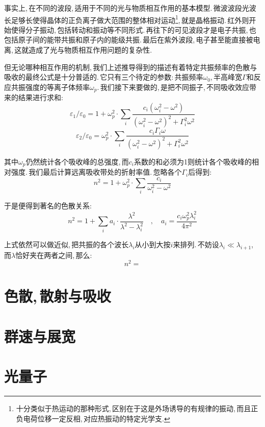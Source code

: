 事实上,\,在不同的波段,\,适用于不同的光与物质相互作用的基本模型.\,微波波段光波长足够长使得晶体的正负离子做大范围的整体相对运动\footnote{十分类似于热运动的那种形式,\,区别在于这是外场诱导的有规律的振动,\,而且正负电荷位移一定反相,\,对应热振动的特定光学支.},\,就是晶格振动.\,红外则开始使得分子振动,\,包括转动和振动等不同形式.\,再往下的可见波段才是电子共振,\,也包括原子间的能带共振和原子内的能级共振.\,最后在紫外波段,\,电子甚至能直接被电离,\,这就造成了光与物质相互作用问题的复杂性.

但无论哪种相互作用的机制,\,我们上述推导得到的描述有着特定共振频率的色散与吸收的最终公式是十分普适的.\,它只有三个待定的参数:\,共振频率$\omega_0$,\,半高峰宽$\Gamma$和反应共振强度的等离子体频率$\omega_p$.\,我们接下来要做的,\,是把不同振子,\,不同吸收效应带来的结果进行求和:
\[\varepsilon_1/\varepsilon_0=1+\omega_p^2\cdot\sum_i\frac{c_i(\omega_i^2-\omega^2)}{(\omega_i^2-\omega^2)^2+\Gamma_i^2\omega^2}\]
\[\varepsilon_2/\varepsilon_0=\omega_p^2\cdot\sum_i\frac{c_i\Gamma_i\omega}{(\omega_i^2-\omega^2)^2+\Gamma_i^2\omega^2}\]

其中$\omega_p$仍然统计各个吸收峰的总强度,\,而$c_i$系数的和必须为1则统计各个吸收峰的相对强度.\,我们最后计算远离吸收带处的折射率值.\,忽略各个$\Gamma_i$后得到:
\[n^2=1+\omega_p^2\cdot\sum_i\frac{c_i}{\omega_i^2-\omega^2}\]

于是便得到著名的色散关系:
\[n^2=1+\sum_i a_i\cdot\frac{\lambda^2}{\lambda^2-\lambda_i^2}\quad,\quad a_i=\frac{c_i\omega_p^2\lambda_i^2}{4\pi^2}\]

上式依然可以做近似,\,把共振的各个波长$\lambda_i$从小到大按$i$来排列.\,不妨设$\lambda_i\ll\lambda_{i+1}$,\,而$\lambda$恰好夹在两者之间,\,那么:
\[n^2=\]


\section{色散,\,散射与吸收}

\section{群速与展宽}

\section{光量子}

